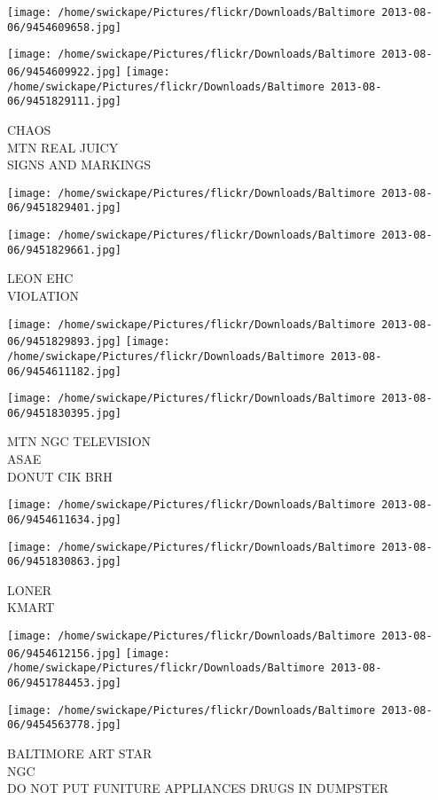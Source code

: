 \documentclass[10pt,letterpaper]{article}
\begin{document}
\texttt{[image: /home/swickape/Pictures/flickr/Downloads/Baltimore 2013-08-06/9454609658.jpg]}

\vspace{0.25in}
\texttt{[image: /home/swickape/Pictures/flickr/Downloads/Baltimore 2013-08-06/9454609922.jpg]}
\texttt{[image: /home/swickape/Pictures/flickr/Downloads/Baltimore 2013-08-06/9451829111.jpg]}

CHAOS\\
MTN REAL JUICY\\
SIGNS AND MARKINGS
\pagebreak

\texttt{[image: /home/swickape/Pictures/flickr/Downloads/Baltimore 2013-08-06/9451829401.jpg]}

\vspace{0.25in}
\texttt{[image: /home/swickape/Pictures/flickr/Downloads/Baltimore 2013-08-06/9451829661.jpg]}

LEON EHC\\
VIOLATION
\pagebreak

\texttt{[image: /home/swickape/Pictures/flickr/Downloads/Baltimore 2013-08-06/9451829893.jpg]}
\texttt{[image: /home/swickape/Pictures/flickr/Downloads/Baltimore 2013-08-06/9454611182.jpg]}

\texttt{[image: /home/swickape/Pictures/flickr/Downloads/Baltimore 2013-08-06/9451830395.jpg]}

MTN NGC TELEVISION\\
ASAE\\
DONUT CIK BRH
\pagebreak

\texttt{[image: /home/swickape/Pictures/flickr/Downloads/Baltimore 2013-08-06/9454611634.jpg]}

\vspace{0.25in}
\texttt{[image: /home/swickape/Pictures/flickr/Downloads/Baltimore 2013-08-06/9451830863.jpg]}

LONER\\
KMART
\pagebreak

\texttt{[image: /home/swickape/Pictures/flickr/Downloads/Baltimore 2013-08-06/9454612156.jpg]}
\texttt{[image: /home/swickape/Pictures/flickr/Downloads/Baltimore 2013-08-06/9451784453.jpg]}

\vspace{0.25in}
\texttt{[image: /home/swickape/Pictures/flickr/Downloads/Baltimore 2013-08-06/9454563778.jpg]}

BALTIMORE ART STAR\\
NGC\\
DO NOT PUT FUNITURE APPLIANCES DRUGS IN DUMPSTER
\pagebreak
\end{document}
